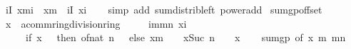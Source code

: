 \begin{isabellebody}
\ \ \ {\isachardoublequoteopen}{\isacharparenleft}{\kern0pt}{\isasymSum}i{\isasymin}I{\isachardot}{\kern0pt}\ x{\isacharcircum}{\kern0pt}{\isacharparenleft}{\kern0pt}m{\isacharplus}{\kern0pt}i{\isacharparenright}{\kern0pt}{\isacharparenright}{\kern0pt}\ {\isacharequal}{\kern0pt}\ x{\isacharcircum}{\kern0pt}m\ {\isacharasterisk}{\kern0pt}\ {\isacharparenleft}{\kern0pt}{\isasymSum}i{\isasymin}I{\isachardot}{\kern0pt}\ x{\isacharcircum}{\kern0pt}i{\isacharparenright}{\kern0pt}{\isachardoublequoteclose}\isanewline
%
\isadelimproof
\ \ %
\endisadelimproof
%
\isatagproof
{}\isamarkupfalse%
\ {\isacharparenleft}{\kern0pt}simp\ add{\isacharcolon}{\kern0pt}\ sum{\isacharunderscore}{\kern0pt}distrib{\isacharunderscore}{\kern0pt}left\ power{\isacharunderscore}{\kern0pt}add{\isacharparenright}{\kern0pt}%
\endisatagproof
{\isafoldproof}%
%
\isadelimproof
\isanewline
%
\endisadelimproof
\isanewline
{}\isamarkupfalse%
\ sum{\isacharunderscore}{\kern0pt}gp{\isacharunderscore}{\kern0pt}offset{\isacharcolon}{\kern0pt}\isanewline
\ \ \ x\ {\isacharcolon}{\kern0pt}{\isacharcolon}{\kern0pt}\ {\isachardoublequoteopen}{\isacharprime}{\kern0pt}a{\isacharcolon}{\kern0pt}{\isacharcolon}{\kern0pt}{\isacharbraceleft}{\kern0pt}comm{\isacharunderscore}{\kern0pt}ring{\isacharcomma}{\kern0pt}division{\isacharunderscore}{\kern0pt}ring{\isacharbraceright}{\kern0pt}{\isachardoublequoteclose}\isanewline
\ \ \ \ \ {\isachardoublequoteopen}{\isacharparenleft}{\kern0pt}{\isasymSum}i{\isacharequal}{\kern0pt}m{\isachardot}{\kern0pt}{\isachardot}{\kern0pt}m{\isacharplus}{\kern0pt}n{\isachardot}{\kern0pt}\ x{\isacharcircum}{\kern0pt}i{\isacharparenright}{\kern0pt}\ {\isacharequal}{\kern0pt}\isanewline
\ \ \ \ \ \ \ {\isacharparenleft}{\kern0pt}if\ x\ {\isacharequal}{\kern0pt}\ {}\ then\ of{\isacharunderscore}{\kern0pt}nat\ n\ {\isacharplus}{\kern0pt}\ {}\ else\ x{\isacharcircum}{\kern0pt}m\ {\isacharasterisk}{\kern0pt}\ {\isacharparenleft}{\kern0pt}{}\ {\isacharminus}{\kern0pt}\ x{\isacharcircum}{\kern0pt}Suc\ n{\isacharparenright}{\kern0pt}\ {\isacharslash}{\kern0pt}\ {\isacharparenleft}{\kern0pt}{}\ {\isacharminus}{\kern0pt}\ x{\isacharparenright}{\kern0pt}{\isacharparenright}{\kern0pt}{\isachardoublequoteclose}\isanewline
%
\isadelimproof
\ \ %
\endisadelimproof
%
\isatagproof
{}\isamarkupfalse%
\ sum{\isacharunderscore}{\kern0pt}gp\ {\isacharbrackleft}{\kern0pt}of\ x\ m\ {\isachardoublequoteopen}m{\isacharplus}{\kern0pt}n{\isachardoublequoteclose}{\isacharbrackright}{\kern0pt}\isanewline

\end{isabellebody}

